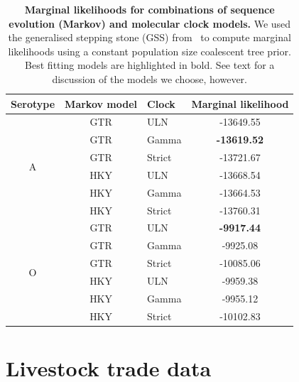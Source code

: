 \documentclass[a4paper,10pt]{article}
\begin{document}
\begin{table}[!ht]
\caption{\textbf{Marginal likelihoods for combinations of sequence evolution (Markov) and molecular clock models.}
We used the generalised stepping stone (GSS) from~\cite{M-Baele2015} to compute marginal likelihoods using a constant population size coalescent tree prior.
Best fitting models are highlighted in bold.
See text for a discussion of the models we choose, however.
}
\begin{center}
 \begin{tabular}{cclc}
\hline
Serotype & Markov model & Clock & Marginal likelihood \\
\hline
\multirow{6}{*}{A} & GTR & ULN & -13649.55 \\
 & GTR & Gamma & \textbf{-13619.52} \\
 & GTR & Strict & -13721.67 \\
 & HKY & ULN & -13668.54 \\
 & HKY & Gamma & -13664.53 \\
 & HKY & Strict & -13760.31 \\
 \hline
\multirow{6}{*}{O}& GTR & \multicolumn{1}{l}{ULN} & \textbf{-9917.44} \\
\multicolumn{1}{l}{} & GTR & \multicolumn{1}{l}{Gamma} & -9925.08 \\
\multicolumn{1}{l}{} & GTR & \multicolumn{1}{l}{Strict} & -10085.06 \\
\multicolumn{1}{l}{} & HKY & \multicolumn{1}{l}{ULN} & -9959.38 \\
\multicolumn{1}{l}{} & HKY & \multicolumn{1}{l}{Gamma} & -9955.12 \\
\multicolumn{1}{l}{} & HKY & \multicolumn{1}{l}{Strict} & -10102.83\\
\hline
\end{tabular}
\end{center}
\label{stab:treeclockselection}
\end{table}

\section*{Livestock trade data}
\end{document}
